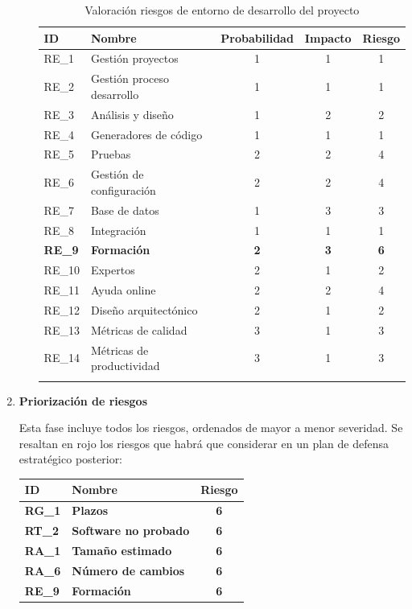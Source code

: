 \begin{enumerate}
\begin{itemize}
\begin{longtable}{l p{5cm} ccc}
\hline
\textbf{ID} & \textbf{Nombre} & \textbf{Probabilidad} & \textbf{Impacto} & \textbf{Riesgo} \\
\hline
\endhead
\endfoot
RE\_1 & 
Gestión proyectos &
1 &
1 &
1 
 \\
RE\_2 & 
Gestión proceso desarrollo &
1 &
1 &
1 
 \\
RE\_3 & 
Análisis y diseño &
1 &
2 &
2 
 \\
RE\_4 & 
Generadores de código &
1 &
1 &
1 
 \\
RE\_5 & 
Pruebas &
2 &
2 &
4 
 \\
RE\_6 & 
Gestión de configuración &
2 &
2 &
4 
 \\
RE\_7 & 
Base de datos  &
1 &
3 &
3 
 \\
RE\_8 & 
Integración &
1 &
1 &
1 
 \\
\textbf{RE\_9} & 
\textbf{Formación} &
\textbf{2} &
\textbf{3} &
\textbf{6} 
 \\
RE\_10 & 
Expertos &
2 &
1 &
2 
 \\
RE\_11 & 
Ayuda online &
2 &
2 &
4 
 \\
RE\_12 & 
Diseño arquitectónico &
2 &
1 &
2 
 \\
RE\_13 & 
Métricas de calidad &
3 &
1 &
3 
 \\
RE\_14 & 
Métricas de productividad &
3 &
1 &
3 
\\
\hline
\caption{Valoración riesgos de entorno de desarrollo del proyecto}\label{ries_entorno_valoracion}\\
\end{longtable}

\endgroup

\end{itemize}

\item \textbf{Priorización de riesgos} \par
Esta fase incluye todos los riesgos, ordenados de mayor a menor severidad. Se resaltan en rojo los riesgos que habrá que considerar en un plan de defensa estratégico posterior:


\begingroup
\renewcommand\arraystretch{1.3}

\begin{longtable}{l p{5cm} c}
\hline
\textbf{ID} & \textbf{Nombre} & \textbf{Riesgo} \\
\hline
\endhead
\endfoot
\textbf{RG\_1} & 
\textbf{Plazos} &
\textbf{6} 
 \\
\textbf{RT\_2} & 
\textbf{Software no probado} &
\textbf{6} 
 \\
\textbf{RA\_1} & 
\textbf{Tamaño estimado} &
\textbf{6} 
 \\
\textbf{RA\_6} & 
\textbf{Número de cambios} &
\textbf{6} 
 \\
\textbf{RE\_9} & 
\textbf{Formación} &
\textbf{6} 
 \\
 

\end{longtable}
\end{enumerate}
